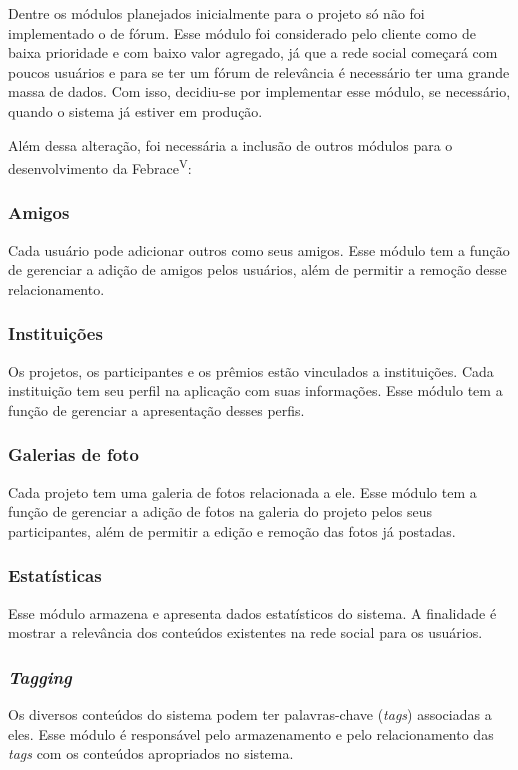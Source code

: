     Dentre os módulos planejados inicialmente para o projeto só não foi implementado o de fórum. Esse módulo foi considerado pelo cliente como de baixa prioridade e com baixo valor agregado, já que a rede social começará com poucos usuários e para se ter um fórum de relevância é necessário ter uma grande massa de dados. Com isso, decidiu-se por implementar esse módulo, se necessário, quando o sistema já estiver em produção.

    Além dessa alteração, foi necessária a inclusão de outros módulos para o desenvolvimento da Febrace\textsuperscript{V}:

    \subsubsection{Amigos}
      Cada usuário pode adicionar outros como seus amigos. Esse módulo tem a função de gerenciar a adição de amigos pelos usuários, além de permitir a remoção desse relacionamento.

    \subsubsection{Instituições}
        Os projetos, os participantes e os prêmios estão vinculados a instituições. Cada instituição tem seu perfil na aplicação com suas informações. Esse módulo tem a função de gerenciar a apresentação desses perfis.

    \subsubsection{Galerias de foto}
      Cada projeto tem uma galeria de fotos relacionada a ele. Esse módulo tem a função de gerenciar a adição de fotos na galeria do projeto pelos seus participantes, além de permitir a edição e remoção das fotos já postadas.

    \subsubsection{Estatísticas}
        Esse módulo armazena e apresenta dados estatísticos do sistema. A finalidade é mostrar a relevância dos conteúdos existentes na rede social para os usuários.

    \subsubsection{\textit{Tagging}}
        Os diversos conteúdos do sistema podem ter palavras-chave (\textit{tags}) associadas a eles. Esse módulo é responsável pelo armazenamento e pelo relacionamento das \textit{tags} com os conteúdos apropriados no sistema. 

